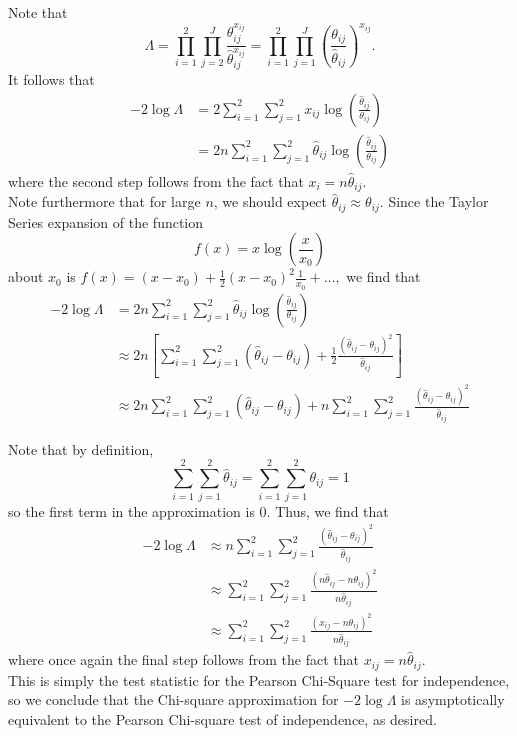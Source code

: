 \begin{enumerate}[a)]
    Note that 
    \[
        \Lambda = \prod_{i=1}^{2}\prod_{j=2}^J \frac{\theta_{ij}^{x_{ij}}}{\hat{\theta}_{ij}^{x_{ij}}} = \prod_{i=1}^{2}\prod_{j=1}^J \left( \frac{\theta_{ij}}{\hat{\theta}_{ij}}\right)^{x_{ij}}.
    \]
    It follows that
    \begin{align*}
        -2 \log \Lambda &= 2 \sum_{i=1}^{2} \sum_{j=1}^2 x_{ij} \log \left( \frac{\hat{\theta}_{ij}}{\theta_{ij}} \right) \\
        &= 2n \sum_{i=1}^{2} \sum_{j=1}^2 \hat{\theta}_{ij} \log \left( \frac{\hat{\theta}_{ij}}{\theta_{ij}} \right)
    \end{align*}
    where the second step follows from the fact that $x_i = n\hat{\theta}_{ij}$. \\

    Note furthermore that for large $n$, we should expect $\hat{\theta}_{ij} \approx \theta_{ij}$. Since the Taylor Series expansion of the function
    \[
        f(x) = x \log \left( \frac{x}{x_0} \right)
    \] 
    about $x_0$ is $f(x) = (x - x_0) + \frac{1}{2} (x-x_0)^2 \frac{1}{x_0} + \dots,$ we find that
    \begin{align*}
        -2 \log \Lambda &= 2n \sum_{i=1}^{2} \sum_{j=1}^2 \hat{\theta}_{ij} \log \left( \frac{\hat{\theta}_{ij}}{\theta_{ij}} \right) \\
        &\approx 2n  \left[\sum_{i=1}^{2} \sum_{j=1}^2 \left( \hat{\theta}_{ij} - \theta_{ij} \right) +  \frac{1}{2} \frac{(\hat{\theta}_{ij} - \theta_{ij})^2}{\hat{\theta}_{ij}}\right] \\
        &\approx 2n  \sum_{i=1}^{2} \sum_{j=1}^2 \left( \hat{\theta}_{ij} - \theta_{ij} \right) + n \sum_{i=1}^2 \sum_{j=1}^2 \frac{(\hat{\theta}_{ij} - \theta_{ij})^2}{\hat{\theta}_{ij}}
    \end{align*}

    Note that by definition, 
    \[
        \sum_{i=1}^{2} \sum_{j=1}^2 \hat{\theta}_{ij} = \sum_{i=1}^{2} \sum_{j=1}^2 \theta_{ij} = 1
    \]
    so the first term in the approximation is $0$. Thus, we find that
    \begin{align*}
        -2 \log \Lambda &\approx n \sum_{i=1}^2 \sum_{j=1}^2 \frac{(\hat{\theta}_{ij} - \theta_{ij})^2}{\hat{\theta}_{ij}}\\
        &\approx \sum_{i=1}^2 \sum_{j=1}^2 \frac{(n\hat{\theta}_{ij} - n\theta_{ij})^2}{n\hat{\theta}_{ij}} \\
        &\approx \sum_{i=1}^2 \sum_{j=1}^2 \frac{(x_{ij} - n\theta_{ij})^2}{n\hat{\theta}_{ij}}
    \end{align*}
    where once again the final step follows from the fact that $x_{ij} = n\hat{\theta}_{ij}$. \\
    
    This is simply the test statistic for the Pearson Chi-Square test for independence, so
    we conclude that the Chi-square approximation for $-2\log \Lambda$ is asymptotically equivalent to the Pearson Chi-square test of independence, as desired.
    
    
\end{enumerate}
